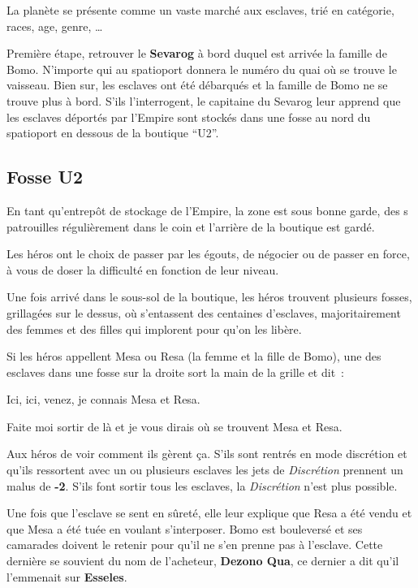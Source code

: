 \documentclass{jdrp}
\begin{document}
	La planète se présente comme un vaste marché aux esclaves, trié en catégorie, races, age, genre, \ldots

	Première étape, retrouver le \textbf{Sevarog} à bord duquel est arrivée la famille de Bomo. N’importe qui au spatioport donnera le numéro du quai où se trouve le vaisseau. Bien sur, les esclaves ont été débarqués et la famille de Bomo ne se trouve plus à bord. S’ils l’interrogent, le capitaine du Sevarog leur apprend que les esclaves déportés par l’Empire sont stockés dans une fosse au nord du spatioport en dessous de la boutique “U2”.

	\subsection{Fosse U2}
	En tant qu’entrepôt de stockage de l’Empire, la zone est sous bonne garde, des s patrouilles régulièrement dans le coin et l’arrière de la boutique est gardé.

	Les héros ont le choix de passer par les égouts, de négocier ou de passer en force, à vous de doser la difficulté en fonction de leur niveau.

	Une fois arrivé dans le sous-sol de la boutique, les héros trouvent plusieurs fosses, grillagées sur le dessus, où s’entassent des centaines d’esclaves, majoritairement des femmes et des filles qui implorent pour qu’on les libère.

	Si les héros appellent Mesa ou Resa (la femme et la fille de Bomo), une des esclaves dans une fosse sur la droite sort la main de la grille et dit~:

	\begin{quotebox}
    	Ici, ici, venez, je connais Mesa et Resa.

    	Faite moi sortir de là et je vous dirais où se trouvent Mesa et Resa.
	\end{quotebox}
	Aux héros de voir comment ils gèrent ça. S’ils sont rentrés en mode discrétion et qu’ils ressortent avec un ou plusieurs esclaves les jets de \textit{Discrétion} prennent un malus de \textbf{-2}. S’ils font sortir tous les esclaves, la \textit{Discrétion} n’est plus possible.

	Une fois que l’esclave se sent en sûreté, elle leur explique que Resa a été vendu et que Mesa a été tuée en voulant s’interposer. Bomo est bouleversé et ses camarades doivent le retenir pour qu’il ne s’en prenne pas à l’esclave. Cette dernière se souvient du nom de l’acheteur, \textbf{Dezono Qua}, ce dernier a dit qu’il l’emmenait sur \textbf{Esseles}.
\end{document}
